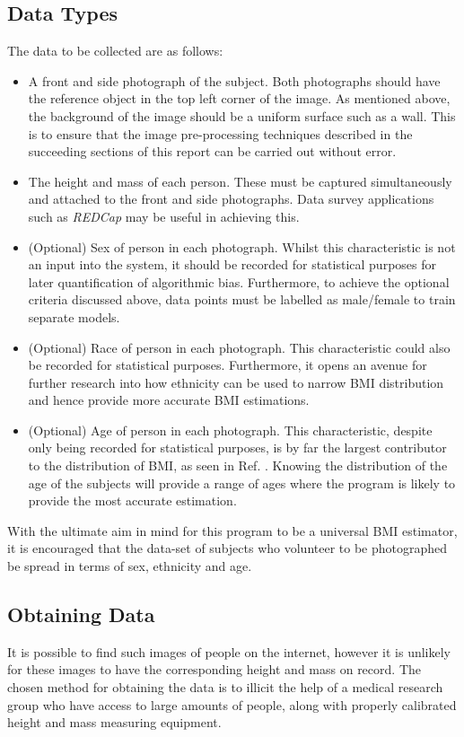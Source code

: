 \documentclass[conference]{IEEEtran}
\begin{document}
\subsection{Data Types}
The data to be collected are as follows:
\begin{itemize}
\item A front and side photograph of the subject.
Both photographs should have the reference object in the top left corner of the image.
As mentioned above, the background of the image should be a uniform surface such as a wall.
This is to ensure that the image pre-processing techniques described in the succeeding sections of this report can be carried out without error.
\item The height and mass of each person.
These must be captured simultaneously and attached to the front and side photographs.
Data survey applications such as \textit{REDCap} may be useful in achieving this.
\item (Optional) Sex of person in each photograph.
Whilst this characteristic is not an input into the system, it should be recorded for statistical purposes for later quantification of algorithmic bias.
Furthermore, to achieve the optional criteria discussed above, data points must be labelled as male/female to train separate models.
\item (Optional) Race of person in each photograph.
This characteristic could also be recorded for statistical purposes.
Furthermore, it opens an avenue for further research into how ethnicity can be used to narrow BMI distribution and hence provide more accurate BMI estimations.
\item (Optional) Age of person in each photograph.
This characteristic, despite only being recorded for statistical purposes, is by far the largest contributor to the distribution of BMI, as seen in Ref. \cite{bmiage}.
Knowing the distribution of the age of the subjects will provide a range of ages where the program is likely to provide the most accurate estimation.
\end{itemize}
With the ultimate aim in mind for this program to be a universal BMI estimator, it is encouraged that the data-set of subjects who volunteer to be photographed be spread in terms of sex, ethnicity and age.
\subsection{Obtaining Data}
It is possible to find such images of people on the internet, however it is unlikely for these images to have the corresponding height and mass on record.
The chosen method for obtaining the data is to illicit the help of a medical research group who have access to large amounts of people, along with properly calibrated height and mass measuring equipment.
\end{document}
